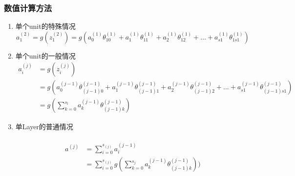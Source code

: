 \subsubsection{数值计算方法}
\begin{enumerate}
\item 单个unit的特殊情况
\begin{equation}
	a_1^{(2)} = g(z_1^{(2)}) = g(a_0^{(1)}\theta_{10}^{(1)}
	+ a_1^{(1)}\theta_{11}^{(1)}
	+ a_2^{(1)}\theta_{12}^{(1)}
	+ \dots
	+ a_{s1}^{(1)}\theta_{1s1}^{(1)})
\end{equation}

\item 单个unit的一般情况
\begin{equation} \begin{aligned}
	a_i^{(j)} &= g(z_i^{(j)})
	\\ & = g(a_0^{(j-1)}\theta_{(j-1)0}^{(j-1)} + a_{1}^{(j-1)}\theta_{(j-1)1}^{(j-1)} + a_2^{(j-1)}\theta_{(j-1)2}^{(j-1)} + \dots + a_{s1}^{(j-1)}\theta_{(j-1)s1}^{(j-1)})
	\\ &= g(\sum_{k=0}^{s_l}{a_k^{(j-1)}\theta_{(j-1)k}^{(j-1)}})
\end{aligned}\end{equation}

\item 单Layer的普通情况 \\
{\color{red}{1. i是否从0开始待确定}} \\
{\color{red}{2. 此公式的正确性待确定，似乎没见过计算整Layer的情况}}
\begin{equation} \begin{aligned}
	a^{(j)} &= \sum_{i=0}^{s_{(j)}}{a_i^{(j-1)}}
		\\ &= \sum_{i=0}^{s_{(j)}}g(\sum_{k=0}^{s_j}{a_k^{(j-1)}\theta_{(j-1)k}^{(j-1)}}))
\end{aligned}\end{equation}
\end{enumerate}

